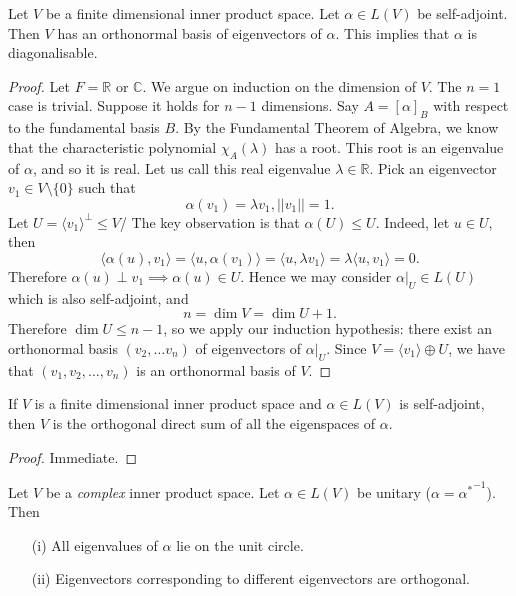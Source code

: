 \documentclass[a4paper]{scrartcl}
\begin{document}
\begin{theorem}
      Let $V$ be a finite dimensional inner product space. Let $\alpha \in L (V)$ be self-adjoint. Then $V$ has an orthonormal basis of eigenvectors of $\alpha$. This implies that $\alpha$ is diagonalisable.
\end{theorem}
\begin{proof}
      Let $F=\mathbb{R}$ or $\mathbb{C}$. We argue on induction on the dimension of $V$. The $n=1$ case is trivial. Suppose it holds for $n-1$ dimensions. Say $A=[\alpha]_B$ with respect to the fundamental basis $B$. By the Fundamental Theorem of Algebra, we know that the characteristic polynomial $\chi_A (\lambda)$ has a root. This root is an eigenvalue of $\alpha$, and so it is real. Let us call this real eigenvalue $\lambda \in \mathbb{R}$. Pick an eigenvector $v_1 \in V \setminus \{0\}$ such that 
      \[\alpha (v_1)= \lambda v_1, ||v_1||=1.\]
      Let $U=\langle v_1 \rangle^\perp \leq V$/
      The key observation is that $\alpha (U) \leq U$. Indeed, let $u \in U$, then 
      \[\langle \alpha (u), v_1 \rangle =\langle u,\alpha (v_1) \rangle =\langle u, \lambda v_1 \rangle =\lambda \langle u,v_1 \rangle =0.\]
      Therefore $\alpha (u)\perp v_1 \implies \alpha (u) \in U$. Hence we may consider $\alpha|_U \in L (U)$ which is also self-adjoint, and 
      \[n=\operatorname{dim}V=\operatorname{dim}U+1.\]
      Therefore $\operatorname{dim}U \leq n-1$, so we apply our induction hypothesis: there exist an orthonormal basis $(v_2,\ldots v_n)$ of eigenvectors of $\alpha|_U$. Since $V=\langle v_1 \rangle \oplus U$, we have that $(v_1,v_2, \ldots , v_n)$ is an orthonormal basis of $V$.
\end{proof}
\begin{corollary}
     If $V$ is a finite dimensional inner product space and $\alpha \in L (V)$ is self-adjoint, then $V$ is the orthogonal direct sum of all the eigenspaces of $\alpha$.
\end{corollary}
\begin{proof}
      Immediate.
\end{proof}

\begin{lemma}
      Let $V$ be a \emph{complex} inner product space. Let $\alpha \in L (V)$ be unitary ($\alpha={\alpha^*}^{-1}$). Then
      \begin{itemize}
           \item[(i)]All eigenvalues of $\alpha$ lie on the unit circle.
           \item[(ii)]Eigenvectors corresponding to different eigenvectors are orthogonal. 
      \end{itemize}
\end{lemma}
\end{document}
